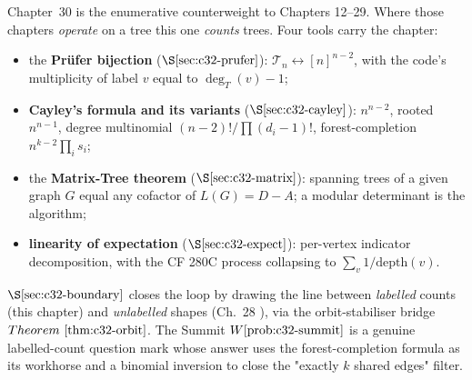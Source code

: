 

Chapter~30 is the enumerative counterweight to Chapters 12--29.  Where those
chapters \emph{operate} on a tree this one \emph{counts} trees.  Four tools
carry the chapter:

\begin{itemize}[nosep]
  \item the \textbf{Pr\"ufer bijection} (\(\secref{c32-prufer}\)):
        \(\mathcal{T}_n\leftrightarrow[n]^{n-2}\), with the code's multiplicity
        of label \(v\) equal to \(\deg_T(v)-1\);
  \item \textbf{Cayley's formula and its variants} (\(\secref{c32-cayley}\)):
        \(n^{n-2}\), rooted \(n^{n-1}\), degree multinomial \((n-2)!/\prod(d_i-1)!\),
        forest-completion \(n^{k-2}\prod_i s_i\);
  \item the \textbf{Matrix-Tree theorem} (\(\secref{c32-matrix}\)): spanning
        trees of a given graph \(G\) equal any cofactor of \(L(G)=D-A\); a
        modular determinant is the algorithm;
  \item \textbf{linearity of expectation} (\(\secref{c32-expect}\)): per-vertex
        indicator decomposition, with the CF 280C process collapsing to
        \(\sum_v 1/\mathrm{depth}(v)\).
\end{itemize}

\(\secref{c32-boundary}\) closes the loop by drawing the line between
\emph{labelled} counts (this chapter) and \emph{unlabelled} shapes
(Ch.~28 ), via the orbit-stabiliser bridge
\(\thmref{c32-orbit}\).  The Summit \(\probref{c32-summit}\) is a genuine
labelled-count question mark whose answer uses the forest-completion formula
as its workhorse and a binomial inversion to close the "exactly \(k\) shared
edges" filter.

